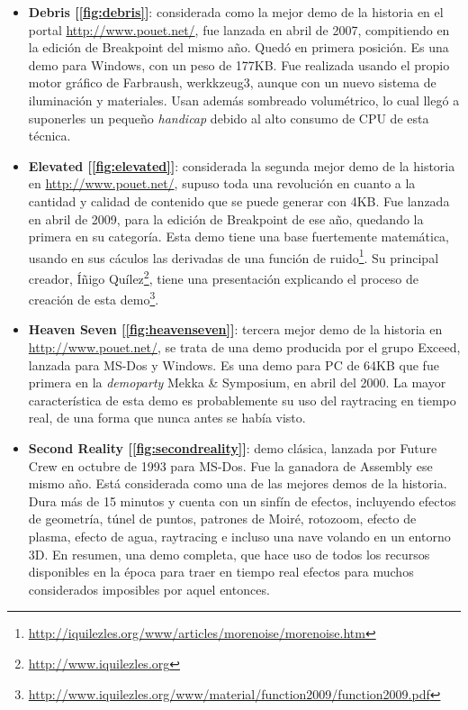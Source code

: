 \begin{itemize}
	\item \textbf{Debris [\ref{fig:debris}]}: considerada como la mejor demo de la historia en el portal \url{http://www.pouet.net/}, fue lanzada en abril de 2007, compitiendo en la edición de Breakpoint del mismo año. Quedó en primera posición. Es una demo para Windows, con un peso de 177KB. Fue realizada usando el propio motor gráfico de Farbraush, werkkzeug3, aunque con un nuevo sistema de iluminación y materiales. Usan además sombreado volumétrico, lo cual llegó a suponerles un pequeño \emph{handicap} debido al alto consumo de CPU de esta técnica.
	\item \textbf{Elevated [\ref{fig:elevated}]}: considerada la segunda mejor demo de la historia en \url{http://www.pouet.net/}, supuso toda una revolución en cuanto a la cantidad y calidad de contenido que se puede generar con 4KB. Fue lanzada en abril de 2009, para la edición de Breakpoint de ese año, quedando la primera en su categoría. Esta demo tiene una base fuertemente matemática, usando en sus cáculos las derivadas de una función de ruido\footnote{\url{http://iquilezles.org/www/articles/morenoise/morenoise.htm}}. Su principal creador, Íñigo Quílez\footnote{\url{http://www.iquilezles.org}}, tiene una presentación explicando el proceso de creación de esta demo\footnote{\url{http://www.iquilezles.org/www/material/function2009/function2009.pdf}}.
	\item \textbf{Heaven Seven [\ref{fig:heavenseven}]}: tercera mejor demo de la historia en \url{http://www.pouet.net/}, se trata de una demo producida por el grupo Exceed, lanzada para MS-Dos y Windows. Es una demo para PC de 64KB que fue primera en la \emph{demoparty} Mekka \& Symposium, en abril del 2000. La mayor característica de esta demo es probablemente su uso del raytracing en tiempo real, de una forma que nunca antes se había visto.
	\item \textbf{Second Reality [\ref{fig:secondreality}]}: demo clásica, lanzada por Future Crew en octubre de 1993 para MS-Dos. Fue la ganadora de Assembly ese mismo año. Está considerada como una de las mejores demos de la historia. Dura más de 15 minutos y cuenta con un sinfín de efectos, incluyendo efectos de geometría, túnel de puntos, patrones de Moiré, rotozoom, efecto de plasma, efecto de agua, raytracing e incluso una nave volando en un entorno 3D. En resumen, una demo completa, que hace uso de todos los recursos disponibles en la época para traer en tiempo real efectos para muchos considerados imposibles por aquel entonces. 

\end{itemize}
